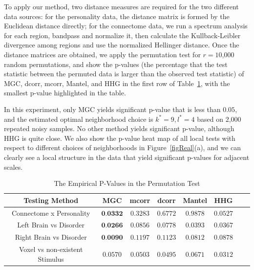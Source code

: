 \documentclass[11pt]{article}
\newcommand{\cs}[1]{{\color{blue}{#1}}}
\begin{document}
To apply our method, two distance measures are required for the two different data sources: for the personality data, the distance matrix is formed by the Euclidean distance directly; for the connectome data, we run a spectrum analysis for each region, bandpass and normalize it, then calculate the Kullback-Leibler divergence among regions and use the normalized Hellinger distance. Once the distance matrices are obtained, we apply the permutation test for $r=10$,$000$ random permutations, and show the p-values (the percentage that the test statistic between the permuted data is larger than the observed test statistic) of MGC, dcorr, mcorr, Mantel, and HHG in the first row of Table~\ref{table1}, with the smallest p-value highlighted in the table. 

In this experiment, only MGC yields significant p-value that is less than $0.05$, and the estimated optimal neighborhood choice is $k^{*}=9, l^{*}=4$ based on $2$,$000$ repeated noisy samples. No other method yields significant p-value, although HHG is quite close. We also show the p-value heat map of all local tests with respect to different choices of neighborhoods in Figure~\ref{figReal}(a), and we can clearly see a local structure in the data that yield significant p-values for adjacent scales.

\cs{we should replace the above experiment by others, or just abandon it; since the MGC p-value is now 0.15 for connectome vs personality, after the current bias adjustment, which is higher than HHG; and no method yields significance for this data set now.}


\begin{table}[!t]
\footnotesize
\renewcommand{\arraystretch}{0.5}
\centering
{\begin{tabular}{|c||c|c|c|c|c|c|c|}
\hline
Testing Method & MGC & mcorr & dcorr & Mantel & HHG \\
\hline
Connectome x Personality & $\textbf{0.0332}$ & $0.3283$ & $0.6772$ & $0.9878$  & $0.0527$ \\
\hline
Left Brain vs Disorder  & $\textbf{0.0266}$ & $0.0856$ & $0.0778$ & $0.0393$ & $0.0367$ \\
\hline
Right Brain vs Disorder & $\textbf{0.0090}$ & $0.1197$ & $0.1123$  & $0.0812$ & $0.0878$\\
\hline
Voxel vs non-existent Stimulus & $0.0570$ & $0.0503$ & $0.0495$  & $0.0671$ & $0.0312$\\
\hline
\end{tabular}
\caption{The Empirical P-Values in the Permutation Test}
\label{table1}
}
\end{table}
\end{document}
